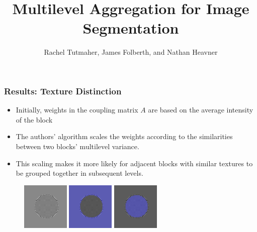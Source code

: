 \documentclass[8pt]{beamer}
\begin{document}
\title{Multilevel Aggregation for Image Segmentation}
\author[]{Rachel Tutmaher, James Folberth, and Nathan  Heavner\\}

\begin{frame}
\titlepage
\end{frame}

\begin{frame}
\frametitle{Results: Texture Distinction}
\begin{itemize}
\item Initially, weights in the coupling matrix $A$ are based on the average intensity of the block
\item The authors' algorithm scales the weights according to the similarities between two blocks' multilevel variance.
\item This scaling makes it more likely for adjacent blocks with similar textures to be grouped together in subsequent levels.
\end{itemize}

\begin{figure}
\centering
\includegraphics[width=0.2\textwidth,height=0.2\textwidth]{checker_disk_60.png} \hspace{.45cm}
\includegraphics[width=0.2\textwidth,height=0.2\textwidth]{checker_disk_good_seg_1.png} \hspace{.45cm}
\includegraphics[width=0.2\textwidth,height=0.2\textwidth]{checker_disk_good_seg_2.png}
\end{figure}

\end{frame}
\end{document}
